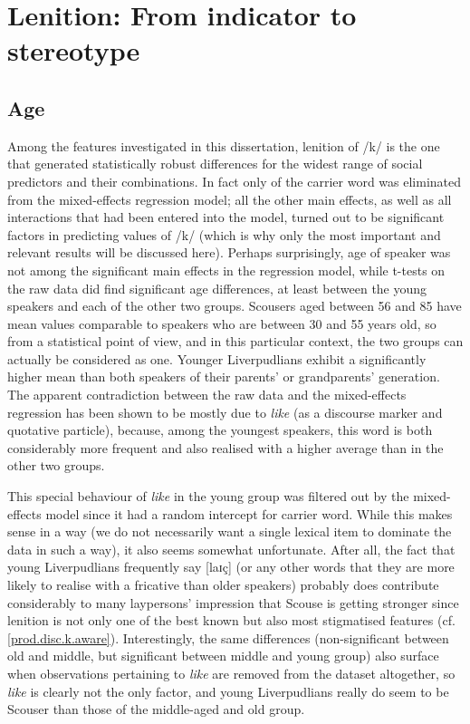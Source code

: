 \section{Lenition: From indicator to stereotype}
\label{prod.disc.k}

\subsection{Age}
\label{prod.disc.k.age}

Among the features investigated in this dissertation, lenition of /k/ is the one that generated statistically robust differences for the widest range of social predictors and their combinations.
In fact only  of the carrier word was eliminated from the mixed-effects regression model; all the other main effects, as well as all interactions that had been entered into the model, turned out to be significant factors in predicting  values of /k/ (which is why only the most important and relevant results will be discussed here).
Perhaps surprisingly, age of speaker was not among the significant main effects in the regression model, while t-tests on the raw data did find significant age differences, at least between the young speakers and each of the other two groups.
Scousers aged between 56 and 85 have mean  values comparable to speakers who are between 30 and 55 years old, so from a statistical point of view, and in this particular context, the two groups can actually be considered as one.
Younger Liverpudlians exhibit a significantly higher mean  than both speakers of their parents' or grandparents' generation.
The apparent contradiction between the raw data and the mixed-effects regression has been shown to be mostly due to \emph{like} (as a discourse marker and quotative particle), because, among the youngest speakers, this word is both considerably more frequent and also realised with a higher average  than in the other two groups. 

This special behaviour of \emph{like} in the young group was filtered out by the mixed-effects model since it had a random intercept for carrier word.
While this makes sense in a way (we do not necessarily want a single lexical item to dominate the data in such a way), it also seems somewhat unfortunate.
After all, the fact that young Liverpudlians frequently say [laɪç] (or any other words that they are more likely to realise with a fricative than older speakers) probably does contribute considerably to many laypersons' impression that Scouse is getting stronger since lenition is not only one of the best known but also most stigmatised features (cf. \ref{prod.disc.k.aware}).
Interestingly, the same differences (non-significant between old and middle, but significant between middle and young group) also surface when observations pertaining to \emph{like} are removed from the dataset altogether, so \emph{like} is clearly not the only factor, and young Liverpudlians really do seem to be Scouser than those of the middle-aged and old group.

